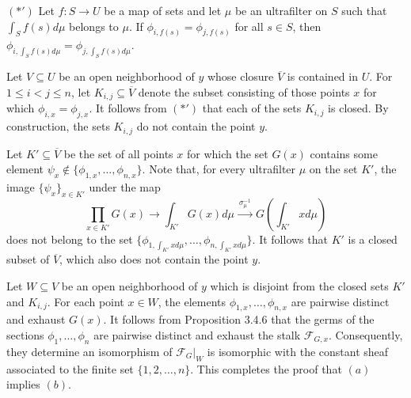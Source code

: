 \documentclass[11pt]{article}
\theoremstyle{plain}
\theoremstyle{definition}
\begin{document}
\smallskip
\noindent $(\ast')$ Let $f : S \to U$ be a map of sets and let $\mu$ be an ultrafilter on $S$ such that $\int_S f(s)d\mu$ belongs to $\mu$. If $\phi_{i,f(s)} = \phi_{j,f(s)}$ for all $s \in S$, then $\phi_{i,\int_S f(s)d\mu} = \phi_{j,\int_S f(s)d\mu}$.
\smallskip

Let $V \subseteq U$ be an open neighborhood of $y$ whose closure $\overline{V}$ is contained in $U$. For $1 \le i < j \le n$, let $K_{i,j} \subseteq \overline{V}$ denote the subset consisting of those points $x$ for which $\phi_{i,x} = \phi_{j,x}$. It follows from $(\ast')$ that each of the sets $K_{i,j}$ is closed. By construction, the sets $K_{i,j}$ do not contain the point $y$.

Let $K' \subseteq \overline{V}$ be the set of all points $x$ for which the set $G(x)$ contains some element $\psi_x \notin \{\phi_{1,x},\dots,\phi_{n,x}\}$. Note that, for every ultrafilter $\mu$ on the set $K'$, the image $\{\psi_x\}_{x \in K'}$ under the map
\[
\prod_{x \in K'} G(x) \to \int_{K'} G(x)d\mu \xrightarrow{\ \sigma_\mu^{-1}\ } G(\int_{K'} x d\mu)
\]
does not belong to the set $\{\phi_{1,\int_{K'} x d\mu},\dots,\phi_{n,\int_{K'} x d\mu}\}$. It follows that $K'$ is a closed subset of $\overline{V}$, which also does not contain the point $y$.

Let $W \subseteq V$ be an open neighborhood of $y$ which is disjoint from the closed sets $K'$ and $K_{i,j}$. For each point $x \in W$, the elements $\phi_{1,x},\dots,\phi_{n,x}$ are pairwise distinct and exhaust $G(x)$. It follows from Proposition 3.4.6 that the germs of the sections $\phi_1,\dots,\phi_n$ are pairwise distinct and exhaust the stalk $\mathscr{F}_{G,x}$. Consequently, they determine an isomorphism of $\mathscr{F}_G|_W$ is isomorphic with the constant sheaf associated to the finite set $\{1,2,\dots,n\}$. This completes the proof that $(a)$ implies $(b)$.
\end{document}
